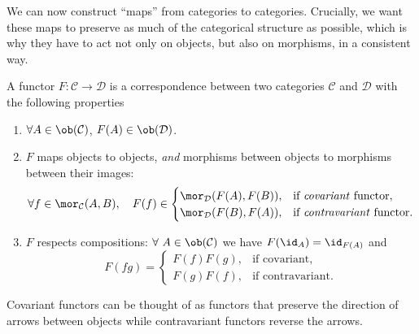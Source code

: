 We can now construct ``maps'' from categories to categories.
Crucially, we want these maps to preserve as much of the categorical
structure as possible, which is why they have to act not only on objects,
but also on morphisms, in a consistent way.
\begin{defn}[Functors]
    A functor $F:\mathcal{C}\rightarrow\mathcal{D}$ is a correspondence
    between two categories $\mathcal{C}$ and $\mathcal{D}$ with the
    following properties 
    \begin{enumerate}
        \item $\forall A\in\ob(\mathcal{C})$, $F(A)\in\ob(\mathcal{D})$.
        \item $F$ maps objects to objects, \emph{and} morphisms between objects to
        morphisms between their images:
        \begin{equation}
            \forall f\in\mor_{\mathcal{C}}(A,B),\quad F(f)\in\begin{cases}
            \mor_{\mathcal{D}}(F(A),F(B)), & \text{if \emph{covariant} functor},\\
            \mor_{\mathcal{D}}(F(B),F(A)), & \text{if \emph{contravariant} functor}.
            \end{cases}
        \end{equation}
        
        \item $F$ respects compositions: $\forall~A\in\ob(\mathcal{C})$ we have $F(\id_{A})=\id_{F(A)}$
        and
        \begin{equation}
            F(fg)=\begin{cases}
            F(f)F(g), & \text{if covariant},\\
            F(g)F(f), & \text{if contravariant}.
            \end{cases}
        \end{equation}
    \end{enumerate}
    Covariant functors can be thought of as functors that preserve the direction
    of arrows between objects while contravariant functors reverse the
    arrows.
\end{defn}

